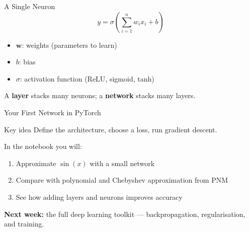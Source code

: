 \documentclass[aspectratio=169, 10pt]{beamer}
\begin{document}
\begin{frame}{A Single Neuron}
$$y = \sigma\!\left(\sum_{i=1}^n w_i x_i + b\right)$$

\bigskip
\begin{itemize}
\item $\mathbf{w}$: weights (parameters to learn)
\item $b$: bias
\item $\sigma$: activation function (ReLU, sigmoid, tanh)
\end{itemize}

\bigskip
A \textbf{layer} stacks many neurons; a \textbf{network} stacks many layers.
\end{frame}

\begin{frame}{Your First Network in PyTorch}
\begin{block}{Key idea}
Define the architecture, choose a loss, run gradient descent.
\end{block}

\bigskip
In the notebook you will:
\begin{enumerate}
\item Approximate $\sin(x)$ with a small network
\item Compare with polynomial and Chebyshev approximation from PNM
\item See how adding layers and neurons improves accuracy
\end{enumerate}

\bigskip
\textbf{Next week:} the full deep learning toolkit --- backpropagation, regularisation, and training.
\end{frame}
\end{document}
